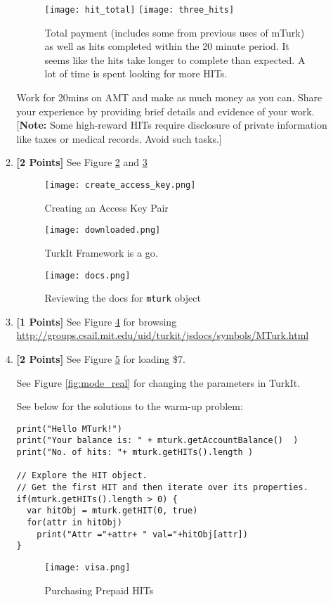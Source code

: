 \documentclass[11pt]{article}
\newcommand{\points}[1]{\textbf{[#1 Points]}}
\begin{document}
\begin{enumerate}
\begin{enumerate}
\begin{figure}[!h]
\centering
\texttt{[image: hit\_total]}
\texttt{[image: three\_hits]}
\caption{Total payment (includes some from previous uses of mTurk) as well as hits completed within the 20 minute period. It seems like the hits take longer to complete than expected. A lot of time is spent looking for more HITs.}
\label{fig:results}
\end{figure}


Work for 20mins on AMT and make as much money as you can. Share your experience by providing brief details and evidence of your work.
%
[\textbf{Note:} Some high-reward HITs require disclosure of private information like taxes or medical records. Avoid such tasks.]
%
\item \points{2} See Figure \ref{fig:create_access_key} and \ref{fig:downloaded_TurkIT}


\begin{figure}[!h]
\centering
\texttt{[image: create\_access\_key.png]}
\caption{Creating an Access Key Pair}
\label{fig:create_access_key}
\end{figure}

\begin{figure}[!h]
\centering
\texttt{[image: downloaded.png]}
\caption{TurkIt Framework is a go.}
\label{fig:downloaded_TurkIT}
\end{figure}

\begin{figure}[!h]
\centering
\texttt{[image: docs.png]}
\caption{Reviewing the docs for \texttt{mturk} object}
\label{fig:review_docs}
\end{figure}

% 
\item \points{1} See Figure \ref{fig:review_docs} for browsing  \url{http://groups.csail.mit.edu/uid/turkit/jsdocs/symbols/MTurk.html}
%
\item \points{2} 
See Figure \ref{fig:load_money} for loading \$7.

See Figure \ref{fig:mode_real} for changing the parameters in TurkIt.

See below for the solutions to the warm-up problem:
\begin{lstlisting}
print("Hello MTurk!")
print("Your balance is: " + mturk.getAccountBalance()  )
print("No. of hits: "+ mturk.getHITs().length )

// Explore the HIT object. 
// Get the first HIT and then iterate over its properties.
if(mturk.getHITs().length > 0) {
  var hitObj = mturk.getHIT(0, true) 
  for(attr in hitObj) 
    print("Attr ="+attr+ " val="+hitObj[attr])
}
\end{lstlisting}
\begin{figure}[!h]
\centering
\texttt{[image: visa.png]}
\caption{Purchasing Prepaid HITs}
\label{fig:load_money}
\end{figure}



\end{enumerate}
\end{enumerate}
\end{document}

